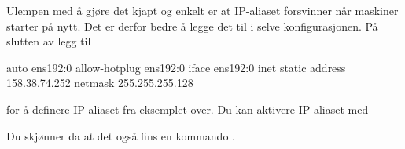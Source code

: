 
Ulempen med å gjøre det kjapt og enkelt er at IP-aliaset forsvinner når maskiner starter
på nytt. Det er derfor bedre å legge det til i selve konfigurasjonen.
På slutten av  legg til

\begin{filedata}
auto ens192:0
allow-hotplug ens192:0
iface ens192:0 inet static
        address 158.38.74.252
        netmask 255.255.255.128
\end{filedata}

for å definere IP-aliaset fra eksemplet over. Du kan aktivere IP-aliaset med


Du skjønner da at det også fins en kommando .